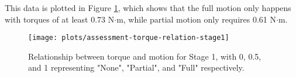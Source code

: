 This data is plotted in Figure \ref{plotassessment-torque-relation-stage1}, which shows that the full motion only happens with torques of at least 0.73 N$\cdot$m, while partial motion only requires 0.61 N$\cdot$m.

\begin{figure}[h]
	\centering
	\texttt{[image: plots/assessment-torque-relation-stage1]}
	\caption{Relationship between torque and motion for Stage 1, with 0, 0.5, and 1 representing "None", "Partial", and "Full" respectively.}
	\label{plotassessment-torque-relation-stage1}
\end{figure}


